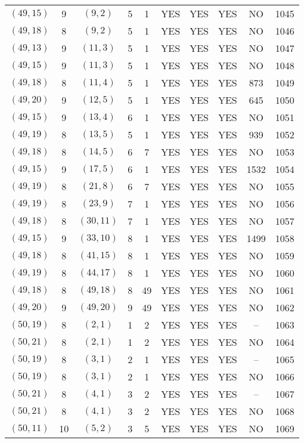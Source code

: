\begin{longtable}{|c|c|c|c|c|c|c|c|c|c|}
$(49, 15)$ & 9 & $(9, 2)$ & 5 & 1 & YES & YES & YES & NO & 1045\\
$(49, 18)$ & 8 & $(9, 2)$ & 5 & 1 & YES & YES & YES & NO & 1046\\
$(49, 13)$ & 9 & $(11, 3)$ & 5 & 1 & YES & YES & YES & NO & 1047\\
$(49, 15)$ & 9 & $(11, 3)$ & 5 & 1 & YES & YES & YES & NO & 1048\\
$(49, 18)$ & 8 & $(11, 4)$ & 5 & 1 & YES & YES & YES & 873 & 1049\\
$(49, 20)$ & 9 & $(12, 5)$ & 5 & 1 & YES & YES & YES & 645 & 1050\\
$(49, 15)$ & 9 & $(13, 4)$ & 6 & 1 & YES & YES & YES & NO & 1051\\
$(49, 19)$ & 8 & $(13, 5)$ & 5 & 1 & YES & YES & YES & 939 & 1052\\
$(49, 18)$ & 8 & $(14, 5)$ & 6 & 7 & YES & YES & YES & NO & 1053\\
$(49, 15)$ & 9 & $(17, 5)$ & 6 & 1 & YES & YES & YES & 1532 & 1054\\
$(49, 19)$ & 8 & $(21, 8)$ & 6 & 7 & YES & YES & YES & NO & 1055\\
$(49, 19)$ & 8 & $(23, 9)$ & 7 & 1 & YES & YES & YES & NO & 1056\\
$(49, 18)$ & 8 & $(30, 11)$ & 7 & 1 & YES & YES & YES & NO & 1057\\
$(49, 15)$ & 9 & $(33, 10)$ & 8 & 1 & YES & YES & YES & 1499 & 1058\\
$(49, 18)$ & 8 & $(41, 15)$ & 8 & 1 & YES & YES & YES & NO & 1059\\
$(49, 19)$ & 8 & $(44, 17)$ & 8 & 1 & YES & YES & YES & NO & 1060\\
$(49, 18)$ & 8 & $(49, 18)$ & 8 & 49 & YES & YES & YES & NO & 1061\\
$(49, 20)$ & 9 & $(49, 20)$ & 9 & 49 & YES & YES & YES & NO & 1062\\
$(50, 19)$ & 8 & $(2, 1)$ & 1 & 2 & YES & YES & YES & -- & 1063\\
$(50, 21)$ & 8 & $(2, 1)$ & 1 & 2 & YES & YES & YES & NO & 1064\\
$(50, 19)$ & 8 & $(3, 1)$ & 2 & 1 & YES & YES & YES & -- & 1065\\
$(50, 19)$ & 8 & $(3, 1)$ & 2 & 1 & YES & YES & YES & NO & 1066\\
$(50, 21)$ & 8 & $(4, 1)$ & 3 & 2 & YES & YES & YES & -- & 1067\\
$(50, 21)$ & 8 & $(4, 1)$ & 3 & 2 & YES & YES & YES & NO & 1068\\
$(50, 11)$ & 10 & $(5, 2)$ & 3 & 5 & YES & YES & YES & NO & 1069\\

\end{longtable}
